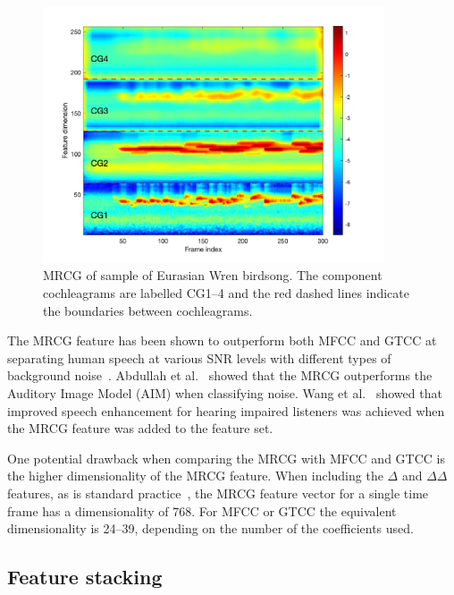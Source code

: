 \begin{figure}[ht]
  \centering
  \includegraphics[width=0.9\textwidth]{figures/mrcg_example.png}
  \caption{MRCG of sample of Eurasian Wren birdsong. The component cochleagrams
  are labelled CG1--4 and the red dashed lines indicate the boundaries
between cochleagrams.}\label{fig:mrcg_example}
\end{figure}

The MRCG feature has been shown to outperform both MFCC and GTCC at
separating human speech at various SNR levels with different types of
background noise~\cite{chen2014feature}. Abdullah et
al.~\cite{binti2020comparison} showed that the MRCG outperforms the Auditory
Image Model (AIM) when classifying noise. Wang et al.~\cite{wang2016joint} showed
that improved speech enhancement for hearing impaired listeners was achieved
when the MRCG feature was added to the feature set.

One potential drawback when comparing the MRCG with MFCC and GTCC is the higher
dimensionality of the MRCG feature. When including the $\Delta$ and
$\Delta\Delta$ features, as is standard
practice~\cite{binti2020comparison,wang2016joint}, the MRCG feature vector for a
single time frame has a dimensionality of 768. For MFCC or GTCC the equivalent
dimensionality is 24--39, depending on the number of the coefficients used.

\subsection{Feature stacking}

